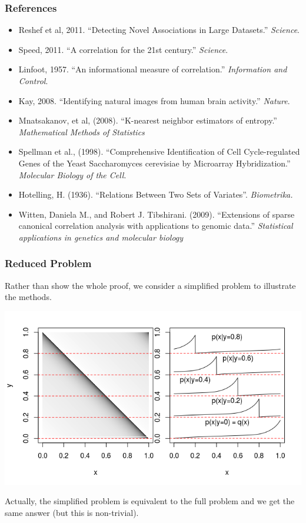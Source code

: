 \documentclass{beamer}
\begin{document}
\begin{frame}
\frametitle{References}
{\tiny
\begin{itemize}
\item Reshef et al, 2011. ``Detecting Novel Associations in Large Datasets.'' \emph{Science}.
\item Speed, 2011. ``A correlation for the 21st century.'' \emph{Science}.
\item Linfoot, 1957.  ``An informational measure of correlation.''  \emph{Information and Control}.
\item Kay, 2008.  ``Identifying natural images from human brain activity.''  \emph{Nature}.
\item Mnatsakanov, et al, (2008). ``K-nearest neighbor estimators of entropy.'' \emph{Mathematical Methods of Statistics}
\item Spellman et al., (1998).  ``Comprehensive Identification of Cell Cycle-regulated Genes of the Yeast Saccharomyces cerevisiae by Microarray Hybridization.''  \emph{Molecular Biology of the Cell}. 
\item Hotelling, H. (1936). ``Relations Between Two Sets of Variates''. \emph{Biometrika.}
\item Witten, Daniela M., and Robert J. Tibshirani. (2009). ``Extensions of sparse canonical correlation analysis with applications to genomic data.'' \emph{Statistical applications in genetics and molecular biology}
\end{itemize}
}
\end{frame}

\begin{frame}
\frametitle{Reduced Problem}
Rather than show the whole proof, we consider a simplified problem to illustrate the methods.
\begin{center}
\includegraphics[scale = 0.5]{../diagram/qxplot.png}
\end{center}

Actually, the simplified problem is equivalent to the full problem and we get the same answer (but this is non-trivial).
\end{frame}
\end{document}
